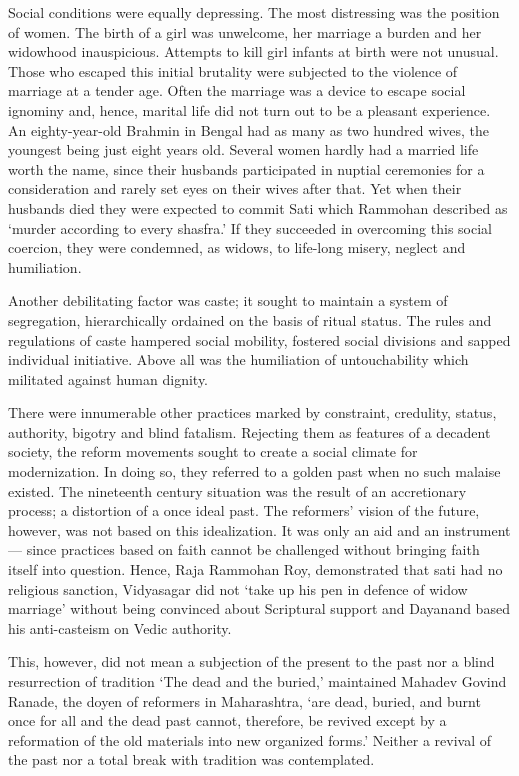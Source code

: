 Social conditions were equally depressing. The most distressing was the position of women. The birth of a girl was unwelcome, her marriage a burden and her widowhood inauspicious. Attempts to kill girl infants at birth were not unusual. Those who escaped this initial brutality were subjected to the violence of marriage at a tender age. Often the marriage was a device to escape social ignominy and, hence, marital life did not turn out to be a pleasant experience. An eighty-year-old Brahmin in Bengal had as many as two hundred wives, the youngest being just eight years old. Several women hardly had a married life worth the name, since their husbands participated in nuptial ceremonies for a consideration and rarely set eyes on their wives after that. Yet when their husbands died they were expected to commit Sati which Rammohan described as `murder according to every shasfra.' If they succeeded in overcoming this social coercion, they were condemned, as widows, to life-long misery, neglect and humiliation.

Another debilitating factor was caste; it sought to maintain a system of segregation, hierarchically ordained on the basis of ritual status. The rules and regulations of caste hampered social mobility, fostered social divisions and sapped individual initiative. Above all was the humiliation of untouchability which militated against human dignity.

There were innumerable other practices marked by constraint, credulity, status, authority, bigotry and blind fatalism. Rejecting them as features of a decadent society, the reform movements sought to create a social climate for modernization. In doing so, they referred to a golden past when no such malaise existed. The nineteenth century situation was the result of an accretionary process; a distortion of a once ideal past. The reformers' vision of the future, however, was not based on this idealization. It was only an aid and an instrument — since practices based on faith cannot be challenged without bringing faith itself into question. Hence, Raja Rammohan Roy, demonstrated that sati had no religious sanction, Vidyasagar did not `take up his pen in defence of widow marriage' without being convinced about Scriptural support and Dayanand based his anti-casteism on Vedic authority.

This, however, did not mean a subjection of the present to the past nor a blind resurrection of tradition `The dead and the buried,' maintained Mahadev Govind Ranade, the doyen of reformers in Maharashtra, `are dead, buried, and burnt once for all and the dead past cannot, therefore, be revived except by a reformation of the old materials into new organized forms.' Neither a revival of the past nor a total break with tradition was contemplated.

